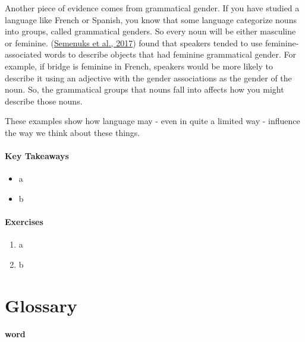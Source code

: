 \documentclass[
]{krantz}
\providecommand{\tightlist}{%
  \setlength{\itemsep}{0pt}\setlength{\parskip}{0pt}}
\begin{document}
Another piece of evidence comes from grammatical gender. If you have studied a language like French or Spanish, you know that some language categorize nouns into groups, called grammatical genders. So every noun will be either masculine or feminine. (\protect\hyperlink{ref-semenuks2017}{Semenuks et al., 2017}) found that speakers tended to use feminine-associated words to describe objects that had feminine grammatical gender. For example, if bridge is feminine in French, speakers would be more likely to describe it using an adjective with the gender associations as the gender of the noun. So, the grammatical groups that nouns fall into affects how you might describe those nouns.

These examples show how language may - even in quite a limited way - influence the way we think about these things.

\hypertarget{key-takeaways-7}{%
\paragraph*{Key Takeaways}\label{key-takeaways-7}}

\begin{itemize}
\tightlist
\item
  a
\item
  b
\end{itemize}

\hypertarget{exercises-7}{%
\paragraph*{Exercises}\label{exercises-7}}

\begin{enumerate}
\def\labelenumi{\arabic{enumi}.}
\tightlist
\item
  a
\item
  b
\end{enumerate}

\hypertarget{glossary-7}{%
\section{Glossary}\label{glossary-7}}

\hypertarget{word}{%
\paragraph*{word}\label{word}}
\end{document}

